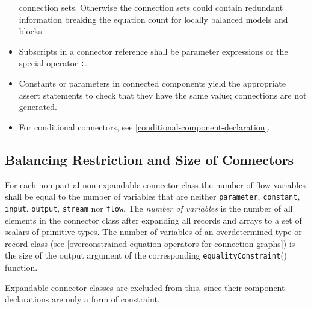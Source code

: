 \begin{itemize}
\begin{nonnormative}
  connection sets.  Otherwise the connection sets could contain redundant information breaking the equation count for locally balanced models and blocks.
  \end{nonnormative}
\item
  Subscripts in a connector reference shall be parameter expressions or
  the special operator \lstinline!:!.
\item
  Constants or parameters in connected components yield the appropriate
  assert statements to check that they have the same value; connections
  are not generated.
\item
  For conditional connectors, see \cref{conditional-component-declaration}.
\end{itemize}

\subsection{Balancing Restriction and Size of Connectors}\label{balancing-restriction-and-size-of-connectors}

For each non-partial non-expandable connector class the number of flow variables shall
be equal to the number of variables that are neither \lstinline!parameter!,
\lstinline!constant!, \lstinline!input!, \lstinline!output!, \lstinline!stream!
nor \lstinline!flow!. The \emph{number of variables} is
the number of all elements in the connector class after expanding all
records and arrays to a set of scalars of primitive types. The number of
variables of an overdetermined type or record class (see \cref{overconstrained-equation-operators-for-connection-graphs})
is the size of the output argument of the corresponding
\lstinline!equalityConstraint!() function.
\begin{nonnormative}
Expandable connector classes are excluded from this, since their component declarations are only a form of constraint.
\end{nonnormative}

